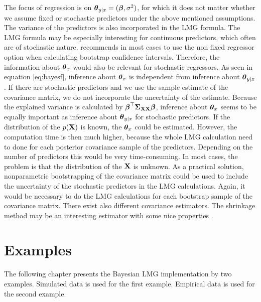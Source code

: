 \documentclass[11pt,a4paper,twoside]{book}\usepackage[]{graphicx}\usepackage[]{color}
\begin{document}
  The focus of regression is on ${\boldsymbol{\theta}}{}_{y \mid x} = ({\boldsymbol{\beta}}, \sigma^2)$, for which it does not matter whether we assume fixed or stochastic predictors under the above mentioned assumptions. The variance of the predictors is also incorporated in the LMG formula. The LMG formula may be especially interesting for continuous predictors, which often are of stochastic nature. \cite{Gromping2006} recommends in most cases to use the non fixed regressor option when calculating bootstrap confidence intervals. Therefore, the information about ${\boldsymbol{\theta}}{}_{x}$ would  also be relevant for stochastic regressors.  As seen in equation \eqref{eq:bayesf}, inference about ${\boldsymbol{\theta}}{}_{x}$  is independent from inference about ${\boldsymbol{\theta}}{}_{y \mid x}$. If there are stochastic predictors and we use the sample estimate of the covariance matrix, we do not incorporate the uncertainty of the estimate.  Because the explained variance is calculated by ${\boldsymbol{\beta}}^\top {\boldsymbol{\Sigma}}{}_{{\mathbf{X}} {\mathbf{X}}}  {\boldsymbol{\beta}}$, inference about  ${\boldsymbol{\theta}}{}_{x}$  seems to be equally important as inference about ${\boldsymbol{\theta}}{}_{y \mid x}$ for stochastic predictors. If the distribution of the $p({\mathbf{X}})$ is known, the ${\boldsymbol{\theta}}{}_{x}$ could be estimated. However, the computation time is then much higher, because the whole LMG calculation need to done for each posterior covariance sample of the predictors. Depending on the number of predictors this would be very time-consuming. In most cases, the problem is that the distribution of the ${\mathbf{X}}$ is unknown. As a practical solution,  nonparametric bootstrapping of the covariance matrix could be used to include the uncertainty of the stochastic predictors in the LMG calculations. Again, it would be necessary to do the LMG calculations for each bootstrap sample of the covariance matrix. There exist also different covariance estimators. The shrinkage method may be an interesting estimator with some nice properties \citep{Schafer2005}. 
  
  
  
 















\chapter{Examples}

The following chapter presents the Bayesian LMG implementation by two examples. Simulated data is used for the first example. Empirical data is used for the second example.
\end{document}
